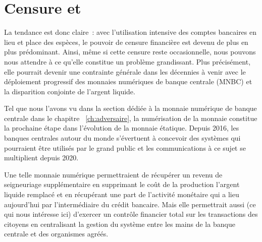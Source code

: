 
\section*{Censure et }


La tendance est donc claire~: avec l'utilisation intensive des comptes bancaires en lieu et place des espèces, le pouvoir de censure financière est devenu de plus en plus prédominant. Ainsi, même si cette censure reste occasionnelle, nous pouvons nous attendre à ce qu'elle constitue un problème grandissant. Plus précisément, elle pourrait devenir une contrainte générale dans les décennies à venir avec le déploiement progressif des monnaies numériques de banque centrale (MNBC) et la disparition conjointe de l'argent liquide.

Tel que nous l'avons vu dans la section dédiée à la monnaie numérique de banque centrale dans le chapitre ~\ref{ch:adversaire}, la numérisation de la monnaie constitue la prochaine étape dans l'évolution de la monnaie étatique. Depuis 2016, les banques centrales autour du monde s'évertuent à concevoir des systèmes qui pourraient être utilisés par le grand public et les communications à ce sujet se multiplient depuis 2020.

Une telle monnaie numérique permettraient de récupérer un revenu de seigneuriage supplémentaire en supprimant le coût de la production l'argent liquide remplacé et en récupérant une part de l'activité monétaire qui a lieu aujourd'hui par l'intermédiaire du crédit bancaire. Mais elle permettrait aussi (ce qui nous intéresse ici) d'exercer un contrôle financier total sur les transactions des citoyens en centralisant la gestion du système entre les mains de la banque centrale et des organismes agréés.


